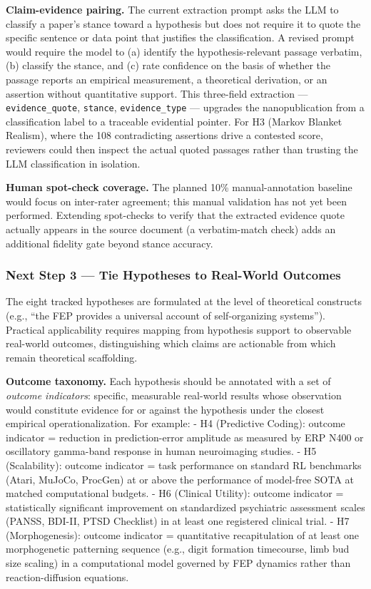 \documentclass[
  english,
]{article}
\begin{document}
{{{{{{{{{{{{{{{{\textbf{Claim-evidence pairing.} The current extraction prompt asks the
LLM to classify a paper's stance toward a hypothesis but does not
require it to quote the specific sentence or data point that justifies
the classification. A revised prompt would require the model to (a)
identify the hypothesis-relevant passage verbatim, (b) classify the
stance, and (c) rate confidence on the basis of whether the passage
reports an empirical measurement, a theoretical derivation, or an
assertion without quantitative support. This three-field extraction ---
\texttt{evidence\_quote}, \texttt{stance}, \texttt{evidence\_type} ---
upgrades the nanopublication from a classification label to a traceable
evidential pointer. For H3 (Markov Blanket Realism), where the 108
contradicting assertions drive a contested score, reviewers could then
inspect the actual quoted passages rather than trusting the LLM
classification in isolation.

\textbf{Human spot-check coverage.} The planned 10\% manual-annotation
baseline would focus on inter-rater agreement; this manual validation
has not yet been performed. Extending spot-checks to verify that the
extracted evidence quote actually appears in the source document (a
verbatim-match check) adds an additional fidelity gate beyond stance
accuracy.

\subsubsection{Next Step 3 --- Tie Hypotheses to Real-World
Outcomes}\label{next-step-3-tie-hypotheses-to-real-world-outcomes}

The eight tracked hypotheses are formulated at the level of theoretical
constructs (e.g., ``the FEP provides a universal account of
self-organizing systems''). Practical applicability requires mapping
from hypothesis support to observable real-world outcomes,
distinguishing which claims are actionable from which remain theoretical
scaffolding.

\textbf{Outcome taxonomy.} Each hypothesis should be annotated with a
set of \emph{outcome indicators}: specific, measurable real-world
results whose observation would constitute evidence for or against the
hypothesis under the closest empirical operationalization. For example:
- H4 (Predictive Coding): outcome indicator = reduction in
prediction-error amplitude as measured by ERP N400 or oscillatory
gamma-band response in human neuroimaging studies. - H5 (Scalability):
outcome indicator = task performance on standard RL benchmarks (Atari,
MuJoCo, ProcGen) at or above the performance of model-free SOTA at
matched computational budgets. - H6 (Clinical Utility): outcome
indicator = statistically significant improvement on standardized
psychiatric assessment scales (PANSS, BDI-II, PTSD Checklist) in at
least one registered clinical trial. - H7 (Morphogenesis): outcome
indicator = quantitative recapitulation of at least one morphogenetic
patterning sequence (e.g., digit formation timecourse, limb bud size
scaling) in a computational model governed by FEP dynamics rather than
reaction-diffusion equations.

}}}}}}}}}}}}}}}}
\end{document}
